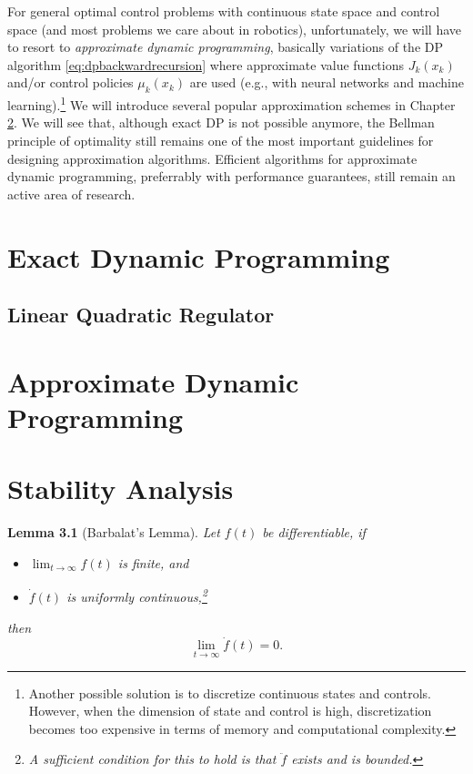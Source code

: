 \documentclass[
]{book}
\newtheorem{lemma}{Lemma}[chapter]
\theoremstyle{definition}
\theoremstyle{definition}
\theoremstyle{definition}
\theoremstyle{definition}
\theoremstyle{remark}
\begin{document}
For general optimal control problems with continuous state space and control space (and most problems we care about in robotics), unfortunately, we will have to resort to \emph{approximate dynamic programming}, basically variations of the DP algorithm \eqref{eq:dpbackwardrecursion} where approximate value functions \(J_k(x_k)\) and/or control policies \(\mu_k(x_k)\) are used (e.g., with neural networks and machine learning).\footnote{Another possible solution is to discretize continuous states and controls. However, when the dimension of state and control is high, discretization becomes too expensive in terms of memory and computational complexity.} We will introduce several popular approximation schemes in Chapter \ref{approximatedp}. We will see that, although exact DP is not possible anymore, the Bellman principle of optimality still remains one of the most important guidelines for designing approximation algorithms. Efficient algorithms for approximate dynamic programming, preferrably with performance guarantees, still remain an active area of research.

\hypertarget{exactdp}{%
\chapter{Exact Dynamic Programming}\label{exactdp}}

\hypertarget{lqr}{%
\section{Linear Quadratic Regulator}\label{lqr}}

\hypertarget{approximatedp}{%
\chapter{Approximate Dynamic Programming}\label{approximatedp}}

\hypertarget{stability}{%
\chapter{Stability Analysis}\label{stability}}

\begin{lemma}[Barbalat's Lemma]
\protect\hypertarget{lem:Barbalat}{}\label{lem:Barbalat}Let \(f(t)\) be differentiable, if

\begin{itemize}
\item
  \(\lim_{t \rightarrow \infty} f(t)\) is finite, and
\item
  \(\dot{f}(t)\) is uniformly continuous,\footnote{A sufficient condition for this to hold is that \(\ddot{f}\) exists and is bounded.}
\end{itemize}

then
\[
\lim_{t \rightarrow \infty} \dot{f}(t) = 0.
\]
\end{lemma}
\end{document}
